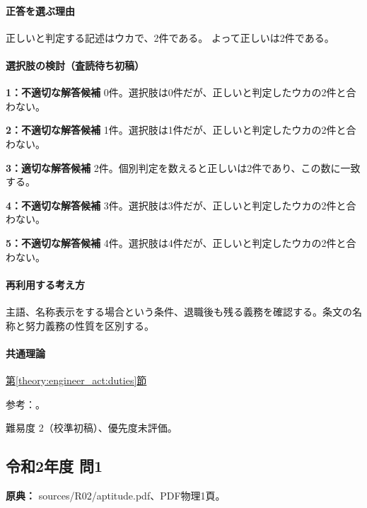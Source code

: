 \paragraph{正答を選ぶ理由} 正しいと判定する記述はウカで、2件である。  よって正しいは2件である。

\paragraph{選択肢の検討（査読待ち初稿）}

\noindent\textbf{1：不適切な解答候補} 0件。選択肢は0件だが、正しいと判定したウカの2件と合わない。\par

\noindent\textbf{2：不適切な解答候補} 1件。選択肢は1件だが、正しいと判定したウカの2件と合わない。\par

\noindent\textbf{3：適切な解答候補} 2件。個別判定を数えると正しいは2件であり、この数に一致する。\par

\noindent\textbf{4：不適切な解答候補} 3件。選択肢は3件だが、正しいと判定したウカの2件と合わない。\par

\noindent\textbf{5：不適切な解答候補} 4件。選択肢は4件だが、正しいと判定したウカの2件と合わない。\par

\paragraph{再利用する考え方} 主語、名称表示をする場合という条件、退職後も残る義務を確認する。条文の名称と努力義務の性質を区別する。

\paragraph{共通理論} \hyperref[theory:engineer_act:duties]{第\ref*{theory:engineer_act:duties}節}

\par 参考：\cite{engineer_act_current}。

\par 難易度 2（校準初稿）、優先度未評価。

\subsection{令和2年度 問1}
\label{q:r02-reg-apt-01}

\noindent\textbf{原典：} sources/R02/aptitude.pdf、PDF物理1頁。

